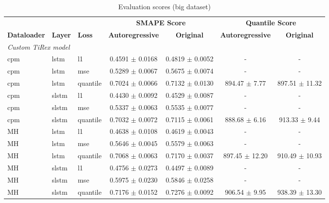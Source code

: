 \documentclass[a4paper,oneside,10pt,ngerman,english]{scrartcl}
\begin{document}
\begin{table}[htbp]
	\centering
	\begin{threeparttable}
		\caption{Evaluation scores (big dataset)}
		\label{tab:scores_custom_tirex_full}
		\setlength{\tabcolsep}{3pt}
		\begin{tabular}{lllcccc}
			\toprule
			& & & \multicolumn{2}{c}{\textbf{SMAPE Score}} & \multicolumn{2}{c}{\textbf{Quantile Score}} \\
			\cmidrule(lr){4-5} \cmidrule(lr){6-7}
			\textbf{Dataloader} & \textbf{Layer} & \textbf{Loss} & \textbf{Autoregressive} & \textbf{Original} & \textbf{Autoregressive} & \textbf{Original} \\
			\midrule
			\multicolumn{7}{l}{{\small \emph{Custom TiRex model}}}\\
			cpm & lstm & l1         & \cellcolor[HTML]{fdfebc}0.4591 $\pm$ 0.0168 & 0.4819 $\pm$ 0.0052 & -  & -  \\
			cpm & lstm & mse        & \cellcolor[HTML]{fdfebc}0.5289 $\pm$ 0.0067 & 0.5675 $\pm$ 0.0074 & -  & -  \\
			cpm & lstm & quantile   & \cellcolor[HTML]{fdfebc}0.7024 $\pm$ 0.0066 & 0.7132 $\pm$ 0.0130 & 894.47 $\pm$ 7.77 & 897.51 $\pm$ 11.32 \\
			\addlinespace
			cpm & slstm & l1        & \cellcolor[HTML]{fdfebc}0.4430 $\pm$ 0.0092 & 0.4529 $\pm$ 0.0087 & -  & -  \\
			cpm & slstm & mse       & \cellcolor[HTML]{fdfebc}0.5337 $\pm$ 0.0063 & 0.5535 $\pm$ 0.0077 & -  & -  \\
			cpm & slstm & quantile  & \cellcolor[HTML]{fdfebc}0.7032 $\pm$ 0.0072	 & 0.7115 $\pm$ 0.0061 & 888.68 $\pm$ 6.16 & 913.33 $\pm$ 9.44 \\
			\addlinespace
			MH & lstm & l1       & 0.4638 $\pm$ 0.0108 & \cellcolor[HTML]{fdfebc}0.4619 $\pm$ 0.0043 & - & - \\
			MH & lstm & mse      & 0.5646 $\pm$ 0.0045 & \cellcolor[HTML]{fdfebc}0.5579 $\pm$ 0.0063 & -  & -  \\
			MH & lstm & quantile & \cellcolor[HTML]{fdfebc}0.7068 $\pm$ 0.0063 & 0.7170 $\pm$ 0.0037 & 897.45 $\pm$ 12.20 & 910.49 $\pm$ 10.93 \\
			\addlinespace
			MH & slstm & l1      & 0.4756 $\pm$ 0.0273 & \cellcolor[HTML]{fdfebc}0.4497 $\pm$ 0.0089 & - & - \\
			MH & slstm & mse     & 0.5975 $\pm$ 0.0230 & \cellcolor[HTML]{fdfebc}0.5846 $\pm$ 0.0258 & - & - \\
			MH & slstm & quantile & \cellcolor[HTML]{fdfebc}0.7176 $\pm$ 0.0152 & 0.7276 $\pm$ 0.0092 & 906.54 $\pm$ 9.95 & 938.39 $\pm$ 13.30 \\

\end{tabular}
\end{threeparttable}
\end{table}
\end{document}
